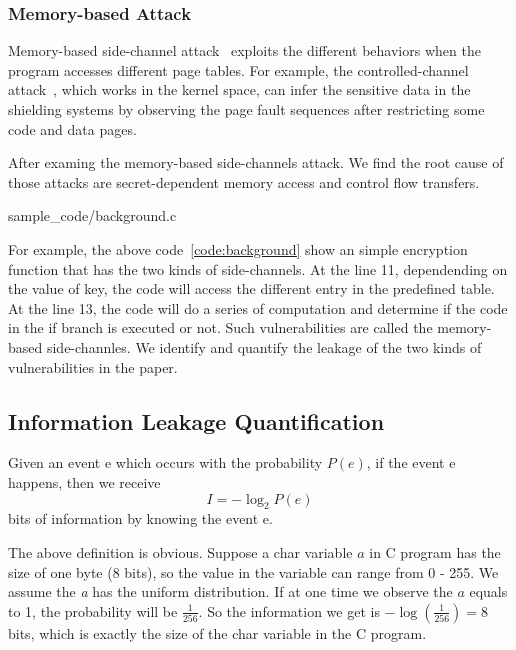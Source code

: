 \subsubsection{Memory-based Attack}
Memory-based side-channel attack~\cite{7163052} exploits the different behaviors when the
program accesses different page tables. For example, the controlled-channel attack~\cite{7163052},
which works in the kernel space, can infer the sensitive data in the shielding systems by
observing the page fault sequences after restricting some code and
data pages. 

After examing the memory-based side-channels attack. We find the root
cause of those attacks are secret-dependent memory access and control
flow transfers.


                 {sample_code/background.c}

For example, the above code~\ref{code:background} show an simple encryption function that
has the two kinds of side-channels. At the line 11, dependending on the value of key,
the code will access the different entry in the predefined table. At the
line 13, the code will do a series of computation and determine if the code in the if
branch is executed or not. Such vulnerabilities are called the memory-based 
side-channles. We identify and quantify the leakage of the two kinds of vulnerabilities 
in the paper.

\subsection{Information Leakage Quantification}
Given an event e which occurs with the probability $P(e)$, if the event e happens, 
then we receive
\begin{displaymath}
    I = - \log_2P(e)
\end{displaymath}
bits of information by knowing the event e.

The above definition is obvious. Suppose a char variable $a$ in C program has the size
of one byte (8 bits), so the value in the variable can range from 0 - 255. We assume
the \textit{a} has the uniform distribution. If at one time we observe the $a$
equals to 1, the probability will be $\frac{1}{256}$. So the information we get is 
$-\log(\frac{1}{256}) = 8$ bits, which is exactly the size of the char variable in the C program.


